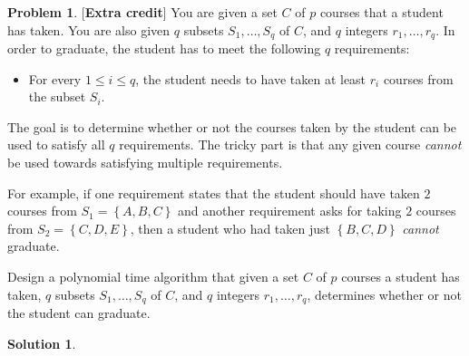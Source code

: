 \documentclass{article}
\theoremstyle{definition}
\newtheorem{problem}{Problem}
\newtheorem*{solution*}{Solution}
\newenvironment{solution}{\begin{solution*}}{{} \end{solution*}}
\newcommand{\set}[1]{\ensuremath{\left\{ #1 \right\}}}
\begin{document}
\begin{problem}\label{extra}[\textbf{Extra credit}]
You are given a set $C$ of $p$ courses that a student has taken. You are also given $q$ subsets $S_1,\ldots,S_q$ of $C$, and $q$ integers $r_1,\ldots,r_q$. In order to graduate, the 
student has to meet the following $q$ requirements: 
\begin{itemize}
\item For every $1 \leq i \leq q$, the student needs to have taken at least $r_i$ courses from the subset $S_i$. 
\end{itemize}
The goal is to determine whether or not the courses taken by the student can be used to satisfy all $q$ requirements.
The tricky part is that any given course \emph{cannot} be used towards satisfying multiple requirements. 

\smallskip
For example, if one requirement 
states that the student should have taken $2$ courses from $S_1 =  \set{A,B,C}$ and another requirement asks for taking $2$ courses from
$S_2 = \set{C,D,E}$, then a student who had taken just $\set{B,C,D}$ \emph{cannot} graduate. 

\smallskip
Design a polynomial time algorithm that given a set $C$ of $p$ courses a student has taken, $q$ subsets $S_1,\ldots,S_q$ of $C$, and $q$ integers $r_1,\ldots,r_q$, determines whether or not the student can graduate.    

\end{problem}

\medskip
		\begin{solution}
		\end{solution}
		
\end{document}
